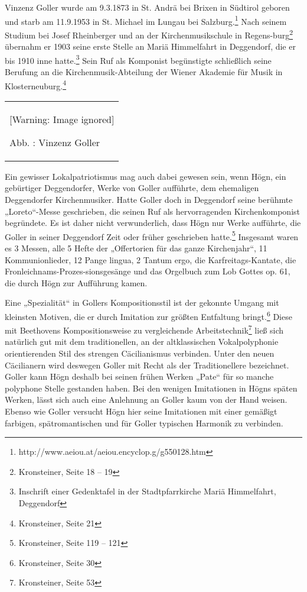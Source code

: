 \documentclass[a4paper]{article}
\newcounter{Abb}
\renewcommand\theAbb{\arabic{Abb}}
\begin{document}
Vinzenz Goller wurde am 9.3.1873 in St. Andrä bei Brixen in Südtirol
geboren und starb am 11.9.1953 in St. Michael im Lungau bei
Salzburg.\footnote{ http://www.aeiou.at/aeiou.encyclop.g/g550128.htm}
Nach seinem Studium bei Josef Rheinberger und an der Kirchenmusikschule
in Regens-burg\footnote{ Kronsteiner, Seite 18 – 19} übernahm er 1903
seine erste Stelle an Mariä Himmelfahrt in Deggendorf, die er bis 1910
inne hatte.\footnote{ Inschrift einer Gedenktafel in der
Stadtpfarrkirche Mariä Himmelfahrt, Deggendorf} Sein Ruf als Komponist
begünstigte schließlich seine Berufung an die Kirchenmusik-Abteilung
der Wiener Akademie für Musik in Klosterneuburg.\footnote{ Kronsteiner,
Seite 21}

\begin{center}
\begin{minipage}{4.249cm}
\begin{flushleft}
\tablefirsthead{}
\tablehead{}
\tabletail{}
\tablelasttail{}
\begin{supertabular}{m{4.0490003cm}}
  [Warning: Image ignored] %
 
Abb. \stepcounter{Abb}{\theAbb}: Vinzenz Goller\\
\end{supertabular}
\end{flushleft}
\end{minipage}
\end{center}
Ein gewisser Lokalpatriotismus mag auch dabei gewesen sein, wenn Högn,
ein gebürtiger Deggendorfer, Werke von Goller aufführte, dem ehemaligen
Deggendorfer Kirchenmusiker. Hatte Goller doch in Deggendorf seine
berühmte „Loreto“-Messe geschrieben, die seinen Ruf als hervorragenden
Kirchenkomponist begründete. Es ist daher nicht verwunderlich, dass
Högn nur Werke aufführte, die Goller in seiner Deggendorf Zeit oder
früher geschrieben hatte.\footnote{ Kronsteiner, Seite 119 – 121}
Insgesamt waren es 3 Messen, alle 5 Hefte der „Offertorien für das
ganze Kirchenjahr“, 11 Kommunionlieder, 12 Pange
lingua,\textcolor[rgb]{0.6,0.6,0.6}{ }2 Tantum ergo, die
Karfreitags-Kantate, die Fronleichnams-Prozes-sionsgesänge und das
Orgelbuch zum Lob Gottes op. 61, die durch Högn zur Aufführung kamen.

Eine „Spezialität“ in Gollers Kompositionsstil ist der gekonnte Umgang
mit kleinsten Motiven, die er durch Imitation zur größten Entfaltung
bringt.\footnote{ Kronsteiner, Seite 30} Diese mit Beethovens
Kompositionsweise zu vergleichende Arbeitstechnik\footnote{
Kronsteiner, Seite 53} ließ sich natürlich gut mit dem traditionellen,
an der altklassischen Vokalpolyphonie orientierenden Stil des strengen
Cäcilianismus verbinden. Unter den neuen Cäcilianern wird deswegen
Goller mit Recht als der Traditionellere bezeichnet. Goller kann Högn
deshalb bei seinen frühen Werken „Pate“ für so manche polyphone Stelle
gestanden haben. Bei den wenigen Imitationen in Högns späten Werken,
lässt sich auch eine Anlehnung an Goller kaum von der Hand weisen.
Ebenso wie Goller versucht Högn hier seine Imitationen mit einer
gemäßigt farbigen, spätromantischen und für Goller typischen Harmonik
zu verbinden. 
\end{document}
